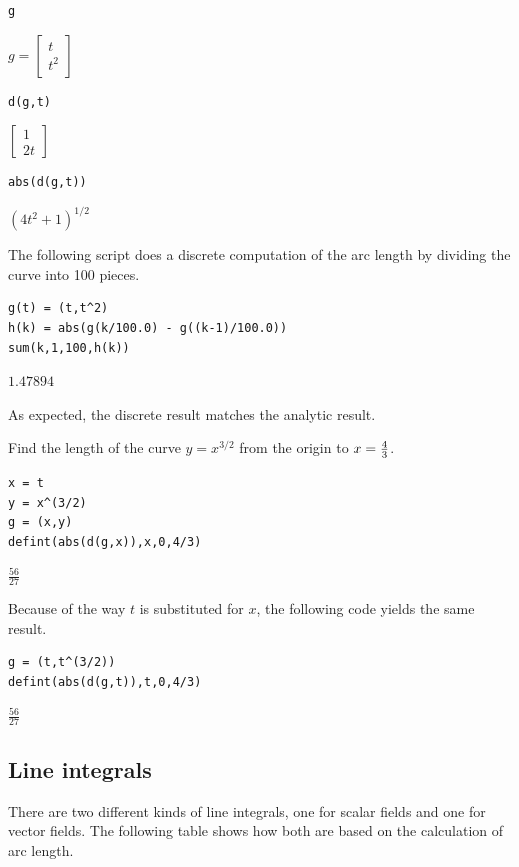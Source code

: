 \begin{Verbatim}[formatcom=\color{blue},samepage=true]
g
\end{Verbatim}

$\displaystyle g=\begin{bmatrix}t\\ t^2\end{bmatrix}$

\begin{Verbatim}[formatcom=\color{blue},samepage=true]
d(g,t)
\end{Verbatim}

$\displaystyle \begin{bmatrix}1\\ 2t\end{bmatrix}$

\begin{Verbatim}[formatcom=\color{blue},samepage=true]
abs(d(g,t))
\end{Verbatim}

$\displaystyle (4t^2+1)^{1/2}$

The following script does a discrete computation of the arc length
by dividing the curve into 100 pieces.

\begin{Verbatim}[formatcom=\color{blue},samepage=true]
g(t) = (t,t^2)
h(k) = abs(g(k/100.0) - g((k-1)/100.0))
sum(k,1,100,h(k))
\end{Verbatim}

$\displaystyle 1.47894$

As expected, the discrete result matches the analytic result.

Find the length of the curve $y=x^{3/2}$ from the origin to
$x={4\over3}$.

\begin{Verbatim}[formatcom=\color{blue},samepage=true]
x = t
y = x^(3/2)
g = (x,y)
defint(abs(d(g,x)),x,0,4/3)
\end{Verbatim}

$\displaystyle \frac{56}{27}$

Because of the way $t$ is substituted for $x$,
the following code yields the same result.

\begin{Verbatim}[formatcom=\color{blue},samepage=true]
g = (t,t^(3/2))
defint(abs(d(g,t)),t,0,4/3)
\end{Verbatim}

$\displaystyle \frac{56}{27}$

\subsection{Line integrals}
There are two different kinds of line integrals,
one for scalar fields and one
for vector fields.
The following table shows how both are based on the calculation of
arc length.

